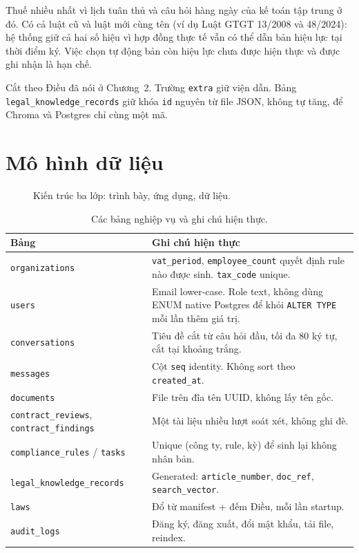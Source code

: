 Thuế nhiều nhất vì lịch tuân thủ và câu hỏi hàng ngày của kế toán tập trung ở
đó. Có cả luật cũ và luật mới cùng tên (ví dụ Luật GTGT 13/2008 và 48/2024):
hệ thống giữ cả hai số hiệu vì hợp đồng thực tế vẫn có thể dẫn bản hiệu lực tại thời điểm ký. Việc chọn tự động bản còn hiệu lực chưa được hiện thực và được ghi nhận là hạn chế.

\label{sec:chunking}
Cắt theo Điều đã nói ở Chương~2. Trường \texttt{extra} giữ viện dẫn. Bảng
\texttt{legal\_knowledge\_records} giữ khóa \texttt{id} nguyên từ file JSON,
không tự tăng, để Chroma và Postgres chỉ cùng một mã.

\section{Mô hình dữ liệu}

\begin{figure}[htp]
\centering
\hinhLop
\caption{Kiến trúc ba lớp: trình bày, ứng dụng, dữ liệu.}
\label{fig:so-do-lop}
\end{figure}

\begin{table}[htp]
\centering
\caption{Các bảng nghiệp vụ và ghi chú hiện thực.}
\label{tab:bang-du-lieu}
\begin{tabular}{p{4.0cm}p{9.8cm}}
\toprule
\textbf{Bảng} & \textbf{Ghi chú hiện thực} \\
\midrule
\texttt{organizations} & \texttt{vat\_period}, \texttt{employee\_count} quyết
định rule nào được sinh. \texttt{tax\_code} unique. \\
\texttt{users} & Email lower-case. Role text, không dùng ENUM native Postgres
để khỏi \texttt{ALTER TYPE} mỗi lần thêm giá trị. \\
\texttt{conversations} & Tiêu đề cắt từ câu hỏi đầu, tối đa 80 ký tự, cắt tại
khoảng trắng. \\
\texttt{messages} & Cột \texttt{seq} identity. Không sort theo
\texttt{created\_at}. \\
\texttt{documents} & File trên đĩa tên UUID, không lấy tên gốc. \\
\texttt{contract\_reviews}, \texttt{contract\_findings} & Một tài liệu nhiều
lượt soát xét, không ghi đè. \\
\texttt{compliance\_rules} / \texttt{tasks} & Unique (công ty, rule, kỳ) để
sinh lại không nhân bản. \\
\texttt{legal\_knowledge\_records} & Generated: \texttt{article\_number},
\texttt{doc\_ref}, \texttt{search\_vector}. \\
\texttt{laws} & Đổ từ manifest + đếm Điều, mỗi lần startup. \\
\texttt{audit\_logs} & Đăng ký, đăng xuất, đổi mật khẩu, tải file, reindex. \\
\bottomrule
\end{tabular}
\end{table}

